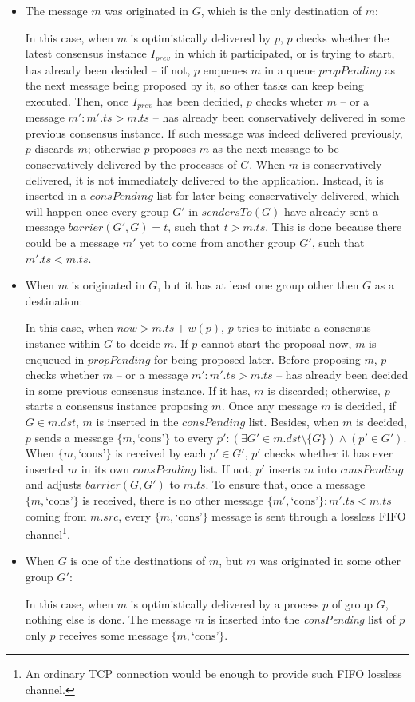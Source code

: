 \documentclass[times, 10pt]{article}
\begin{document}
\begin{itemize}
  \item The message $m$ was originated in $G$, which is the only destination of $m$:
  
  In this case, when $m$ is optimistically delivered by $p$, $p$ checks whether the latest consensus instance $I_{prev}$ in which it participated, or is trying to start, has already been decided -- if not, $p$ enqueues $m$ in a queue $propPending$ as the next message being proposed by it, so other tasks can keep being executed. Then, once $I_{prev}$ has been decided, $p$ checks wheter $m$ -- or a message $m' : m'.ts > m.ts$ -- has already been conservatively delivered in some previous consensus instance. If such message was indeed delivered previously, $p$ discards $m$; otherwise $p$ proposes $m$ as the next message to be conservatively delivered by the processes of $G$. When $m$ is conservatively delivered, it is not immediately delivered to the application. Instead, it is inserted in a $consPending$ list for later being conservatively delivered, which will happen once every group $G'$ in $sendersTo(G)$ have already sent a message $barrier(G',G) = t$, such that $t > m.ts$. This is done because there could be a message $m'$ yet to come from another group $G'$, such that $m'.ts < m.ts$.

  \item When $m$ is originated in $G$, but it has at least one group other then $G$ as a destination:
  
  In this case, when $now > m.ts + w(p)$, $p$ tries to initiate a consensus instance within $G$ to decide $m$. If $p$ cannot start the proposal now, $m$ is enqueued in $propPending$ for being proposed later. Before proposing $m$, $p$ checks whether $m$ -- or a message $m' : m'.ts > m.ts$ -- has already been decided in some previous consensus instance. If it has, $m$ is discarded; otherwise, $p$ starts a consensus instance proposing $m$. Once any message $m$ is decided, if $G \in m.dst$, $m$ is inserted in the $consPending$ list. Besides, when $m$ is decided, $p$ sends a message $\{m, \text{`cons'}\}$ to every \mbox{$p' : (\exists G' \in m.dst \setminus \{G\}) \wedge (p' \in G')$}. When $\{m, \text{`cons'}\}$ is received by each $p' \in G'$, $p'$ checks whether it has ever inserted $m$ in its own $consPending$ list. If not, $p'$ inserts $m$ into $consPending$ and adjusts $barrier(G, G')$ to $m.ts$. To ensure that, once a message $\{m, \text{`cons'}\}$ is received, there is no other message \mbox{$\{m', \text{`cons'}\}:m'.ts<m.ts$} coming from $m.src$, every $\{m, \text{`cons'}\}$ message is sent through a lossless FIFO channel\footnote{An ordinary TCP connection would be enough to provide such FIFO lossless channel.}.
  
  \item When $G$ is one of the destinations of $m$, but $m$ was originated in some other group $G'$:
  
  In this case, when $m$ is optimistically delivered by a process $p$ of group $G$, nothing else is done. The message $m$ is inserted into the \mbox{\textit{consPending}} list of $p$ only $p$ receives some message $\{m, \text{`cons'}\}$.
\end{itemize}
\end{document}
